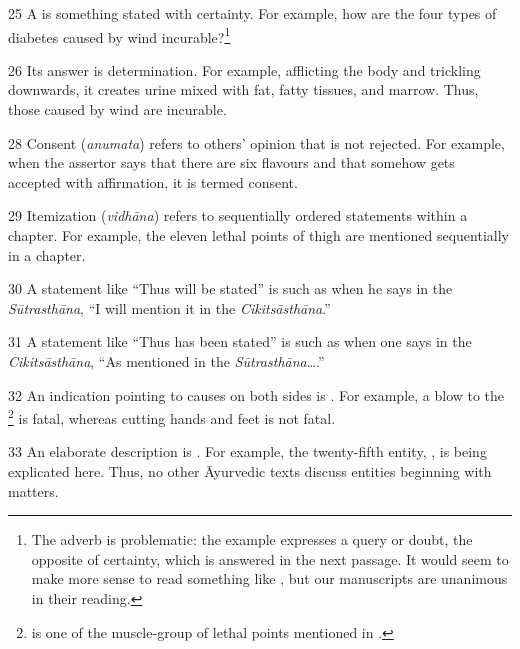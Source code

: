\begin{translation}
\item [25]  A  is something stated
with certainty.  For example, how are the four types of diabetes caused
by wind incurable?\footnote{The adverb  is problematic:
    the example expresses a query or doubt, the opposite of certainty, which
    is answered in the next passage.  It would seem to make more sense to
    read something like ,
    but our manuscripts are unanimous in their reading.}

\item [26] Its answer is determination. For example, afflicting the body and 
trickling downwards, it creates urine mixed with fat, fatty tissues, and 
marrow. Thus, those caused by wind are incurable. 

\item [28]  Consent (\emph{anumata}) refers to 
others' opinion that is not 
rejected. For example, when the assertor says that there are six flavours and 
that somehow gets accepted with affirmation, it is termed consent.

\item [29] Itemization (\emph{vidhāna}) refers to 
sequentially ordered 
statements within a chapter. For example, the eleven lethal points of thigh are 
mentioned sequentially in a chapter.

\item [30] A statement like “Thus will be stated” is  such as when he says in the \emph{Sūtrasthāna}, “I will mention it in 
the \emph{Cikitsāsthāna}.” 

\item [31] A statement like “Thus has been stated” is 
 such as when one says in the 
\emph{Cikitsāsthāna}, “As mentioned in the \emph{Sūtrasthāna}\ldots.” 

\item [32] An indication pointing to causes on both sides is
. For example, a blow to the
\footnote{ is one of the
    muscle-group of lethal points mentioned in .}  is fatal,
    whereas cutting hands and feet is not fatal.

\item [33] An elaborate description is . For example, 
the twenty-fifth entity, , is being explicated here. Thus, no 
other Āyurvedic texts discuss  entities beginning with matters. 


\end{translation}

